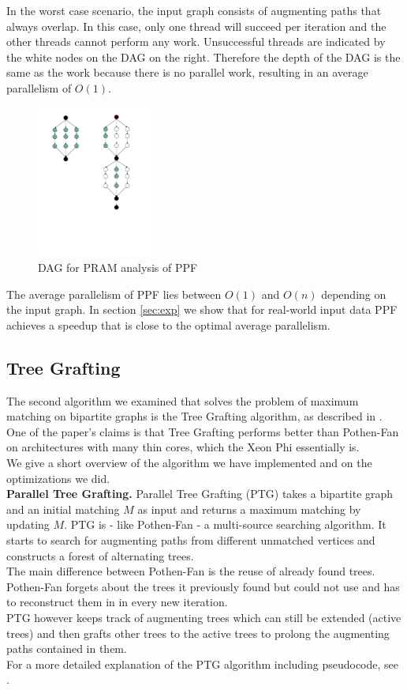 \documentclass[letterpaper]{article}
\newcommand{\mypar}[1]{{\bf #1.}}
\begin{document}
In the worst case scenario, the input graph consists of augmenting paths that always overlap. 
In this case, only one thread will succeed per iteration and the other threads cannot perform any work. 
Unsuccessful threads are indicated by the white nodes on the DAG on the right. 
Therefore the depth of the DAG is the same as the work because there is no parallel work, resulting in an average parallelism of $O(1)$.\\

\begin{figure}\centering
  \includegraphics[height=5cm, trim={2.5cm 8cm 4cm 1cm}, clip]{PRAM.pdf}
  \caption{DAG for PRAM analysis of PPF}
  \label{fig:pram}
\end{figure}

The average parallelism of PPF lies between $O(1)$ and $O(n)$ depending on the input graph. 
In section \ref{sec:exp} we show that for real-world input data PPF achieves a speedup that is close to the optimal average parallelism.

\subsection{Tree Grafting}\label{sec:tg}

The second algorithm we examined that solves the problem of maximum matching on bipartite graphs is the Tree Grafting algorithm, as described in \cite{Azad:2015}. One of the paper's claims is that Tree Grafting performs better than Pothen-Fan on architectures with many thin cores, which the Xeon Phi essentially is. \\
We give a short overview of the algorithm we have implemented and on the optimizations we did. \\

\mypar{Parallel Tree Grafting} 
Parallel Tree Grafting (PTG) takes a bipartite graph and an initial matching $M$ as input and returns a maximum matching by updating $M$.
PTG is - like Pothen-Fan - a multi-source searching algorithm. It starts to search for augmenting paths from different unmatched vertices and constructs a forest of alternating trees.\\
The main difference between Pothen-Fan is the reuse of already found trees. Pothen-Fan forgets about the trees it previously found but could not use and has to reconstruct them in in every new iteration.\\
PTG however keeps track of augmenting trees which can still be extended (active trees) and then grafts other trees to the active trees to prolong the augmenting paths contained in them.\\
For a more detailed explanation of the PTG algorithm including pseudocode, see \cite{Azad:2015}.\\
\end{document}
